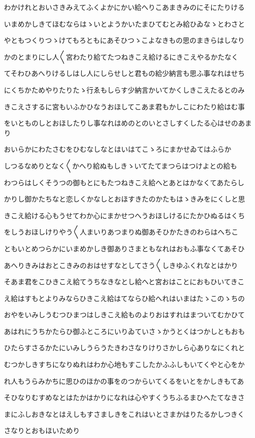 \documentclass[a4paper,11pt,landscape]{ltjtarticle}
\begin{document}
\par\medskip
わかけれとおいさきみえてふくよかにかい給へりこあまきみのにそにたりける
\par\medskip
いまめかしきてほむならはゝいとようかいたまひてむとみ給ひゐなゝとわさと
\par\medskip
やともつくりつゝけてもろともにあそひつゝこよなきもの思のまきらはしなり
\par\medskip
かのとまりにし人〱宮わたり給てたつねきこえ給けるにきこえやるかたなく
\par\medskip
てそわひあへりけるしはし人にしらせしと君もの給少納言も思ふ事なれはせち
\par\medskip
にくちかためやりたりたゝ行ゑもしらす少納言かいてかくしきこえたるとのみ
\par\medskip
きこえさするに宮もいふかひなうおほしてこあま君もかしこにわたり給はむ事
\par\medskip
をいとものしとおほしたりし事なれはめのとのいとさしすくしたる心はせのあまり
\par\medskip
おいらかにわたさむをひむなしなとはいはてこゝろにまかせゐてはふらか
\par\medskip
しつるなめりとなく〱かへり給ぬもしきゝいてたてまつらはつけよとの給も
\par\medskip
わつらはしくそうつの御もとにもたつねきこえ給へとあとはかなくてあたらし
\par\medskip
かりし御かたちなと恋しくかなしとおほすきたのかたもはゝきみをにくしと思
\par\medskip
きこえ給ける心もうせてわか心にまかせつへうおほしけるにたかひぬるはくち
\par\medskip
をしうおほしけりやう〱人まいりあつまりぬ御あそひかたきのわらはへちこ
\par\medskip
ともいとめつらかにいまめかしき御ありさまともなれはおもふ事なくてあそひ
\par\medskip
あへりきみはおとこきみのおはせすなとしてさう〱しきゆふくれなとはかり
\par\medskip
そあま君をこひきこえ給てうちなきなとし給へと宮おはことにおもひいてきこ
\par\medskip
え給はすもとよりみならひきこえ給はてならひ給へれはいまはたゝこのゝちの
\par\medskip
おやをいみしうむつひまつはしきこえ給ものよりおはすれはまついてむかひて
\par\medskip
あはれにうちかたらひ御ふところにいりゐていさゝかうとくはつかしともおも
\par\medskip
ひたらすさるかたにいみしうらうたきわさなりけりさかしら心ありなにくれと
\par\medskip
むつかしきすちになりぬれはわか心地もすこしたかふふしもいてくやと心をか
\par\medskip
れ人もうらみかちに思ひのほかの事をのつからいてくるをいとをかしきもてあ
\par\medskip
そひなりむすめなとはたかはかりになれは心やすくうちふるまひへたてなきさ
\par\medskip
まにふしおきなとはえしもすさましきをこれはいとさまかはりたるかしつきく
\par\medskip
さなりとおもほいためり
\par\medskip
\end{document}
